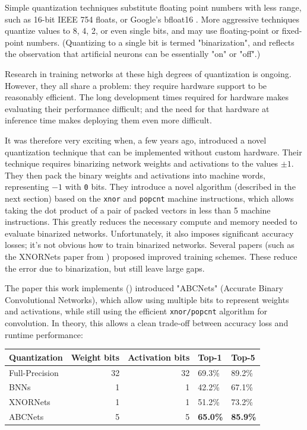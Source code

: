\documentclass[12pt]{article}
\begin{document}
Simple quantization techniques substitute floating point numbers with less range, such as 16-bit IEEE 754 floats, or Google's bfloat16 \citep{bfloat16}. More aggressive techniques quantize values to 8, 4, 2, or even single bits, and may use floating-point or fixed-point numbers.
(Quantizing to a single bit is termed "binarization", and reflects the observation that artificial neurons can be essentially "on" or "off".)

Research in training networks at these high degrees of quantization is ongoing. However, they all share a problem: they require hardware support to be reasonably efficient. The long development times required for hardware makes evaluating their performance difficult; and the need for that hardware at inference time makes deploying them even more difficult.

It was therefore very exciting when, a few years ago, \citet{BinarizedNeuralNetworks} introduced a novel quantization technique that can be implemented without custom hardware.
Their technique requires binarizing network weights and activations to the values \(\pm 1\).
They then pack the binary weights and activations into machine words, representing \(-1\) with \texttt{0} bits. They introduce a novel algorithm (described in the next section) based on the \texttt{xnor} and \texttt{popcnt} machine instructions, which allows taking the dot product of a pair of packed vectors in less than 5 machine instructions.
This greatly reduces the necessary compute and memory needed to evaluate binarized networks. Unfortunately, it also imposes significant accuracy losses; it's not obvious how to train binarized networks. Several papers (such as the XNORNets paper from \citet{XNORNets}) proposed improved training schemes. These reduce the error due to binarization, but still leave large gaps.

The paper this work implements (\citet{ABCNets}) introduced "ABCNets" (Accurate Binary Convolutional Networks), which allow using multiple bits to represent weights and activations,
while still using the efficient \texttt{xnor/popcnt} algorithm for convolution. In theory, this allows a clean trade-off between accuracy loss and runtime performance:

\begin{center}
\begin{tabular}{lrrll}
Quantization & Weight bits & Activation bits & Top-1 & Top-5\\
\hline
Full-Precision & 32 & 32 & 69.3\% & 89.2\%\\
BNNs & 1 & 1 & 42.2\% & 67.1\%\\
XNORNets & 1 & 1 & 51.2\% & 73.2\%\\
ABCNets & 5 & 5 & \textbf{65.0\%} & \textbf{85.9\%}\\
\end{tabular}
\end{center}
\end{document}
